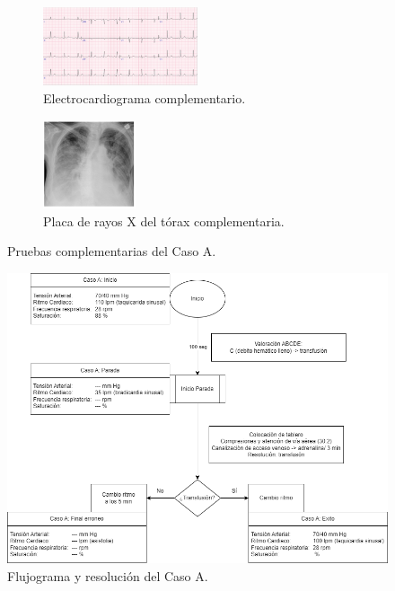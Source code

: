 \begin{figure}[hptb]
    \centering
    \begin{subfigure}{.5\textwidth}
      \centering
      \includegraphics[width=0.5\textwidth]{./imagenes/UCIDoc-SVICasoAECG.png}
      \caption{\label{fig:Brusilov:SVI:CasoAECG}Electrocardiograma complementario.}
    \end{subfigure}%
    \begin{subfigure}{.5\textwidth}
      \centering
      \includegraphics[width=0.3\textwidth]{./imagenes/UCIDoc-SVICasoARXTorax.png}
      \caption{\label{fig:Brusilov:SVI:CasoARXTorax}Placa de rayos X del tórax complementaria.}
    \end{subfigure}
    \caption{\label{fig:Brusilov:SVI:PruebasCasoA}Pruebas complementarias del Caso A.}
\end{figure}

\begin{figure}[hptb]
    \centering
	\includegraphics[width=0.766\linewidth]{./imagenes/ACV-AdSC-CasosUCI_CasoA.png}
	\caption{\label{fig:Brusilov:SVI:CasoA}Flujograma y resolución del Caso A.}
\end{figure}
\clearpage

